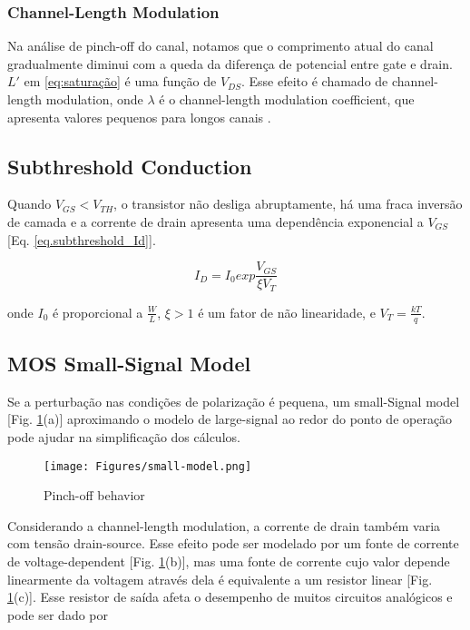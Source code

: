 \documentclass[10pt, conference,a4paper]{IEEEtran}
\begin{document}
\subsubsection{Channel-Length Modulation} Na análise de pinch-off do canal, notamos que o comprimento atual do canal gradualmente diminui com a queda da diferença de potencial entre gate e drain. $L'$ em \ref{eq:saturação} é uma função de $V_{DS}$. Esse efeito é chamado de channel-length modulation, onde $\lambda$ é o channel-length modulation coefficient, que apresenta valores pequenos para longos canais \cite{razavi2005design}.

\subsection{Subthreshold Conduction}
Quando $V_{GS} < V_{TH}$, o transistor não desliga abruptamente, há uma fraca inversão de camada e a corrente de drain apresenta uma dependência exponencial a $V_{GS}$ [Eq. \ref{eq.subthreshold_Id}]. 

\begin{equation}
    I_D = I_0 exp \frac{V_{GS}}{\xi V_T}
    \label{eq.subthreshold_Id}
\end{equation}

 onde $I_0$ é proporcional a $\frac{W}{L}$, $\xi > 1$ é um fator de não linearidade, e $V_T = \frac{kT}{q}$.

\subsection{MOS Small-Signal Model}
Se a perturbação nas condições de polarização é pequena, um small-Signal model [Fig. \ref{fig:small-model}(a)] aproximando o modelo de large-signal ao redor do ponto de operação pode ajudar na simplificação dos cálculos.

\begin{figure}[h]
\centering
\texttt{[image: Figures/small-model.png]}
    \caption{Pinch-off behavior}
    \label{fig:small-model}
\end{figure}

Considerando a channel-length modulation, a corrente de drain também varia com tensão drain-source. Esse efeito pode ser modelado por um fonte de corrente de voltage-dependent [Fig. \ref{fig:small-model}(b)], mas uma fonte de corrente cujo valor depende linearmente da voltagem através dela é equivalente a um resistor linear [Fig. \ref{fig:small-model}(c)]. Esse resistor de saída afeta o desempenho de muitos circuitos analógicos e pode ser dado por
\end{document}
